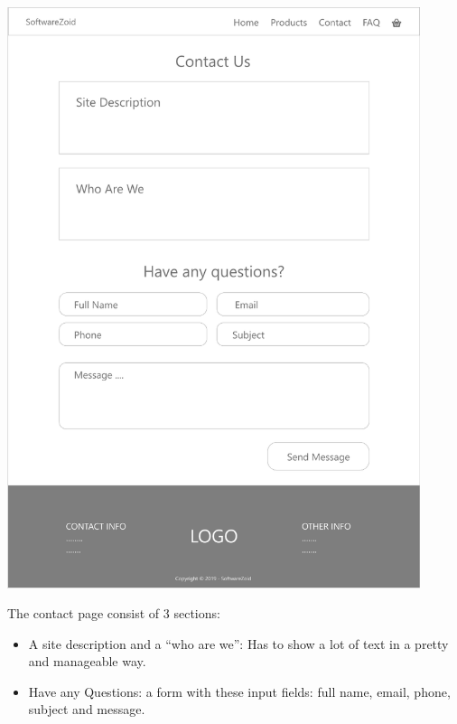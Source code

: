 \documentclass[11pt]{report}
\begin{document}
\begin{center}
\includegraphics[height=17cm]{page5}
\end{center}
\noindent The contact page consist of 3 sections:
\begin{itemize}
  \item A site description and a “who are we”: Has to show a lot of text in a pretty and manageable way.
  \item Have any Questions: a form with these input fields: full name, email, phone, subject and message.
\end{itemize}
\end{document}
